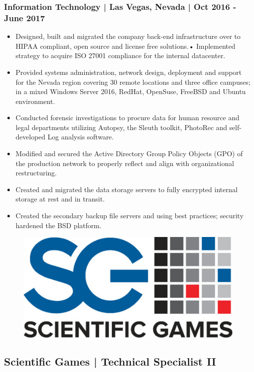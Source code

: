 \documentclass[letter,10pt]{article}
\begin{document}
\subsubsection*{Information Technology | Las Vegas, Nevada | Oct 2016 - June 2017}
\label{sec:orgd759e63}
\begin{itemize}
\item Designed, built and migrated the company back-end infrastructure over to HIPAA compliant, open source and license free solutions.• Implemented strategy to acquire ISO 27001 compliance for the internal datacenter.
\item Provided systems administration, network design, deployment and support for the Nevada region covering 30 remote locations and three office campuses; in a mixed Windows Server 2016, RedHat, OpenSuse, FreeBSD and Ubuntu environment.
\item Conducted forensic investigations to procure data for human resource and legal departments utilizing Autopsy, the Sleuth toolkit, PhotoRec and self-developed Log analysis software.
\item Modified and secured the Active Directory Group Policy Objects (GPO) of the production network to properly reflect and align with organizational restructuring.
\item Created and migrated the data storage servers to fully encrypted internal storage at rest and in transit.
\item Created the secondary backup file servers and using best practices; security hardened the BSD platform.
\end{itemize}



\begin{figure}
\includegraphics[width=0.8\linewidth]{./img/50p_cr_scientific_games.jpg}
\end{figure}

\subsection*{Scientific Games | Technical Specialist II}
\label{sec:org5d7c986}
\end{document}
